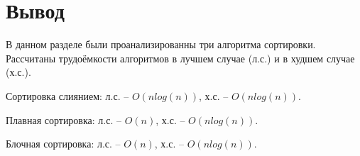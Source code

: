 \begin{center}
	

\newpage
	\centering
	\def\svgwidth{7cm}
	
	\label{ris:imageSS}
\newpage
\centering
\def\svgwidth{3.5cm}

\label{ris:imageSSO1}
\newpage
\centering
\def\svgwidth{8cm}

\label{ris:imageSSO2}
\newpage
\centering
\def\svgwidth{12cm}

\label{ris:imageSSO3}
\newpage
	\centering
	\def\svgwidth{3.5cm}
	
	\label{ris:imageSS1}
\newpage
	\centering
	\def\svgwidth{8cm}
	
	\label{ris:imageSS2}
\newpage
	\centering
		\def\svgwidth{12cm}
	
	\label{ris:imageSS3}

\end{center}
\newpage

\section*{Вывод}
В данном разделе были проанализированны три алгоритма сортировки. Рассчитаны трудоёмкости алгоритмов в лучшем случае (л.с.) и в худшем случае (х.с.).

Сортировка слиянием: л.с. -- $O(nlog(n))$, х.с. -- $O(nlog(n))$.

Плавная сортировка: л.с. -- $O(n)$,  х.с. --  $O(nlog(n))$.

Блочная сортировка: л.с. -- $O(n)$,  х.с. -- $O(nlog(n))$.